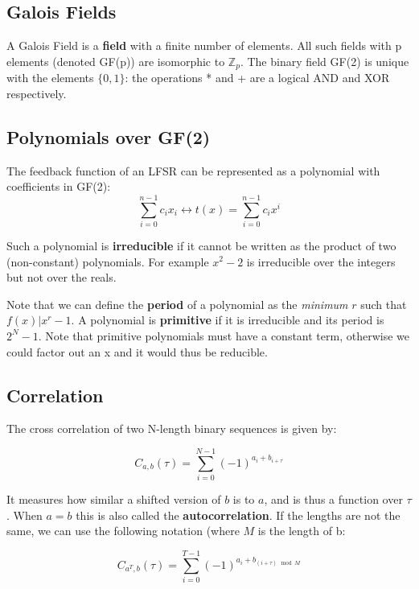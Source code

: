 \documentclass[11pt]{report}
\begin{document}
\subsection{Galois Fields}
A Galois Field is a \textbf{field} with a finite number of elements. All such fields with p elements (denoted GF(p)) are isomorphic to $\mathbb{Z}_p$. The binary field GF(2) is unique with the elements $\{0, 1\}$: the operations * and + are a logical AND and XOR respectively.

\subsection{Polynomials over GF(2)}
The feedback function of an LFSR can be represented as a polynomial with coefficients in GF(2):
\begin{equation}
	\sum_{i=0}^{n-1}c_ix_i \leftrightarrow t(x) = \sum_{i=0}^{n-1}c_ix^i
\end{equation}

Such a polynomial is \textbf{irreducible} if it cannot be written as the product of two (non-constant) polynomials. For example $x^2-2$ is irreducible over the integers but not over the reals.

Note that we can define the \textbf{period} of a polynomial as the \textit{minimum} $r$ such that $f(x) | x^r-1$. A polynomial is \textbf{primitive} if it is irreducible and its period is $2^N-1$.
Note that primitive polynomials must have a constant term, otherwise we could factor out an x and it would thus be reducible.

\subsection{Correlation}
The cross correlation of two N-length binary sequences is given by:

\begin{equation}
	C_{a, b}(\tau) = \sum_{i=0}^{N-1} (-1)^{a_i + b_{i+\tau}}
\end{equation}

It measures how similar a shifted version of $b$ is to $a$, and is thus a function over $\tau$. When $a=b$ this is also called the \textbf{autocorrelation}. If the lengths are not the same, we can use the following notation (where $M$ is the length of b:

\begin{equation}
	\label{eqn:general-cross-correlation}
	C_{a^T,b}(\tau) = \sum_{i=0}^{T-1}(-1)^{a_i + b_{(i + \tau) \mod M}}
\end{equation}
\end{document}
